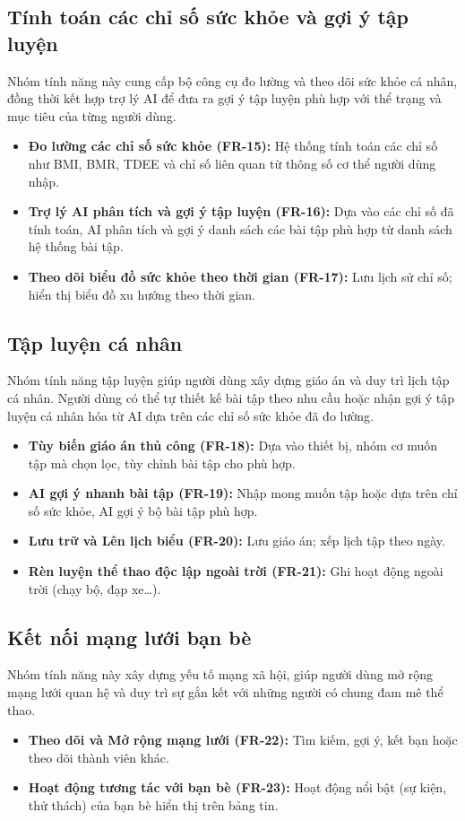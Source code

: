 \subsection{Tính toán các chỉ số sức khỏe và gợi ý tập luyện}
Nhóm tính năng này cung cấp bộ công cụ đo lường và theo dõi sức khỏe cá nhân, đồng thời kết hợp trợ lý AI để đưa ra gợi ý tập luyện phù hợp với thể trạng và mục tiêu của từng người dùng.
\begin{itemize}
    \item \textbf{Đo lường các chỉ số sức khỏe (FR-15):} Hệ thống tính toán các chỉ số như BMI, BMR, TDEE và chỉ số liên quan từ thông số cơ thể người dùng nhập.
    \item \textbf{Trợ lý AI phân tích và gợi ý tập luyện (FR-16):} Dựa vào các chỉ số đã tính toán, AI phân tích và gợi ý danh sách các bài tập phù hợp từ danh sách hệ thống bài tập.
    \item \textbf{Theo dõi biểu đồ sức khỏe theo thời gian (FR-17):} Lưu lịch sử chỉ số; hiển thị biểu đồ xu hướng theo thời gian.
\end{itemize}

\subsection{Tập luyện cá nhân}
Nhóm tính năng tập luyện giúp người dùng xây dựng giáo án và duy trì lịch tập cá nhân. Người dùng có thể tự thiết kế bài tập theo nhu cầu hoặc nhận gợi ý tập luyện cá nhân hóa từ AI dựa trên các chỉ số sức khỏe đã đo lường.
\begin{itemize}
    \item \textbf{Tùy biến giáo án thủ công (FR-18):} Dựa vào thiết bị, nhóm cơ muốn tập mà chọn lọc, tùy chỉnh bài tập cho phù hợp.
    \item \textbf{AI gợi ý nhanh bài tập (FR-19):} Nhập mong muốn tập hoặc dựa trên chỉ số sức khỏe, AI gợi ý bộ bài tập phù hợp.
    \item \textbf{Lưu trữ và Lên lịch biểu (FR-20):} Lưu giáo án; xếp lịch tập theo ngày.
    \item \textbf{Rèn luyện thể thao độc lập ngoài trời (FR-21):} Ghi hoạt động ngoài trời (chạy bộ, đạp xe\ldots).
\end{itemize}

\subsection{Kết nối mạng lưới bạn bè}
Nhóm tính năng này xây dựng yếu tố mạng xã hội, giúp người dùng mở rộng mạng lưới quan hệ và duy trì sự gắn kết với những người có chung đam mê thể thao.
\begin{itemize}
    \item \textbf{Theo dõi và Mở rộng mạng lưới (FR-22):} Tìm kiếm, gợi ý, kết bạn hoặc theo dõi thành viên khác.
    \item \textbf{Hoạt động tương tác với bạn bè (FR-23):}  Hoạt động nổi bật (sự kiện, thử thách) của bạn bè hiển thị trên bảng tin.
\end{itemize}

